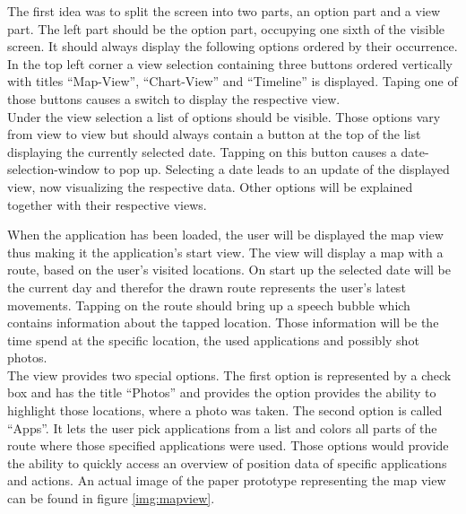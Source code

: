The first idea was to split the screen into two parts, an option part and a view part. The left part should be the option part, occupying one sixth of the visible screen. It should always display the following options ordered by their occurrence.\\
In the top left corner a view selection containing three buttons  ordered vertically with titles ``Map-View'', ``Chart-View'' and ``Timeline'' is displayed. Taping one of those buttons causes a switch to display the respective view.\\
Under the view selection a list of options should be visible. Those options vary from view to view but should always contain a button at the top of the list displaying the currently selected date. Tapping on this button causes a date-selection-window to pop up. Selecting a date leads to an update of the displayed view, now visualizing the respective data.
Other options will be explained together with their respective views.

When  the application has been loaded, the user will be displayed the map view thus making it the application's start view. The view will display a map with a route, based on the user's visited locations. On start up the selected date will be the current day and therefor the drawn route represents the user's latest movements. Tapping on the route should bring up a speech bubble which contains information about the tapped location. Those information will be the time spend at the specific location, the used applications and possibly shot photos.\\
The  view provides two special options. The first option is represented by a check box and has the title ``Photos'' and provides the option provides the ability to highlight those locations, where a photo was taken. The second option is called ``Apps''. It lets the user pick applications from a list and colors all parts of the route where those specified applications were used. Those options would provide the ability to quickly access an overview of position data of specific applications and actions. An actual image of the paper prototype representing the map view can be found in figure \ref{img:mapview}.

